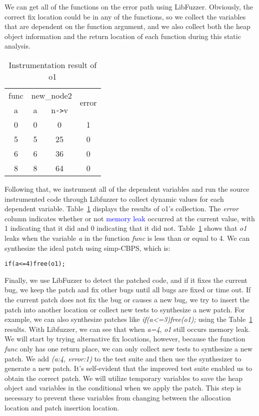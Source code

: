 \documentclass[a4paper,11pt,oneside,openany]{book}
\begin{document}
We can get all of the functions on the error path using LibFuzzer. Obviously, the correct fix location could be in any of the functions, so we collect the variables that are dependent on the function argument, and we also collect both the heap object information and the return location of each function during this static analysis. 

\begin{table}[h]
  \caption{Instrumentation result of o1}
  \label{instres}
  \centering
  \begin{tabular}{|c|c|c|c|}
    \hline
    func  & \multicolumn{2}{|c|}{new\_node2} & \multirow{2}{*}{error} \\
    \cline{1-3}
    a & a & n\verb|->|v &\\
    \hline
     0 & 0  & 0 & 1\\
     5 & 5  & 25 & 0\\
     6 & 6  & 36 & 0\\
     8 & 8  & 64 & 0\\
    \hline
  \end{tabular}
\end{table}

Following that, we instrument all of the dependent variables and run the source instrumented code through Libfuzzer to collect dynamic values for each dependent variable. Table~\ref{instres} displays the results of o1's collection. The {\it error} column indicates whether or not \textcolor{blue}{memory leak} occurred at the current value, with 1 indicating that it did and 0 indicating that it did not. Table~\ref{instres} shows that {\it o1} leaks when the variable {\it a} in the function {\it func} is less than or equal to 4. We can synthesize the ideal patch using simp-CBPS, which is:

\begin{minipage}{\textwidth}
\vspace{0.2cm}
\hspace{0.3cm}
\raggedright
\verb|if(a<=4)free(o1);|
\label{patch1}
\vspace{0.2cm}
\end{minipage}

Finally, we use LibFuzzer to detect the patched code, and if it fixes the current bug, we keep the patch and fix other bugs until all bugs are fixed or time out. If the current patch does not fix the bug or causes a new bug, we try to insert the patch into another location or collect new tests to synthesize a new patch. For example, we can also synthesize patches like {\it if(a<=3)free(o1);} using the Table~\ref{instres} results. With Libfuzzer, we can see that when {\it a=4}, {\it o1} still occurs memory leak. We will start by trying alternative fix locations, however, because the function {\it func} only has one return place, we can only collect new tests to synthesize a new patch. We add {\it (a:4, error:1)} to the test suite and then use the synthesizer to generate a new patch. It's self-evident that the improved test suite enabled us to obtain the correct patch. We will utilize temporary variables to save the heap object and variables in the conditional when we apply the patch. This step is necessary to prevent these variables from changing between the allocation location and patch insertion location.
\end{document}
